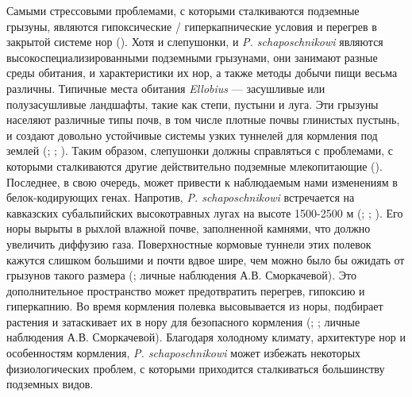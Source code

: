 Самыми стрессовыми проблемами, с которыми сталкиваются подземные грызуны, являются гипоксические / гиперкапнические условия и перегрев в закрытой системе нор (\cite{Lacey2000}). Хотя и слепушонки, и \textit{P. schaposchnikowi} являются высокоспециализированными подземными грызунами, они занимают разные среды обитания, и характеристики их нор, а также методы добычи пищи весьма различны. Типичные места обитания \textit{Ellobius} --- засушливые или полузасушливые ландшафты, такие как степи, пустыни и луга. Эти грызуны населяют различные типы почв, в том числе плотные почвы глинистых пустынь, и создают довольно устойчивые системы узких туннелей для кормления под землей (\cite{Ognev1950}; \cite{Gromov1977}; \cite{Shubin1978}). Таким образом, слепушонки должны справляться с проблемами, с которыми сталкиваются другие действительно подземные млекопитающие (\cite{Lacey2000}). Последнее, в свою очередь, может привести к наблюдаемым нами изменениям в белок-кодирующих генах. Напротив, \textit{P. schaposchnikowi} встречается на кавказских субальпийских высокотравных лугах на высоте 1500-2500 м (\cite{Vereshchagin1959}; \cite{Vorontsov1966}; \cite{Krystufek2005}). Его норы вырыты в рыхлой влажной почве, заполненной камнями, что должно увеличить диффузию газа. Поверхностные кормовые туннели этих полевок кажутся слишком большими и почти вдвое шире, чем можно было бы ожидать от грызунов такого размера (\cite{Vorontsov1966}; личные наблюдения А.В. Сморкачевой). Это дополнительное пространство может предотвратить перегрев, гипоксию и гиперкапнию. Во время кормления полевка высовывается из норы, подбирает растения и затаскивает их в нору для безопасного кормления (\cite{Gambaryan1957}; \cite{Zimina1977}; личные наблюдения А.В. Сморкачевой). Благодаря холодному климату, архитектуре нор и особенностям кормления, \textit{P. schaposchnikowi} может избежать некоторых физиологических проблем, с которыми приходится сталкиваться большинству подземных видов.

